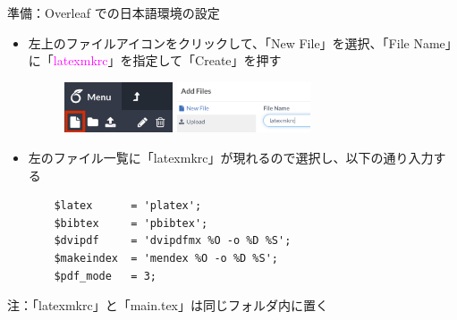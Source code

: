 \documentclass[dvipdfmx]{beamer}
\begin{document}
\begin{frame}[fragile]{準備：Overleaf での日本語環境の設定}
\begin{itemize}
    \item 左上のファイルアイコンをクリックして、「New File」を選択、「File Name」に「\textcolor{magenta}{latexmkrc}」を指定して「Create」を押す
    \begin{figure}
        \centering
        \includegraphics[height=1.5cm]{fig_new_file.jpg}
        \qquad
        \includegraphics[height=1.5cm]{fig_latexmkrc.pdf}
    \end{figure}
    
    \item 左のファイル一覧に「latexmkrc」が現れるので選択し、以下の通り入力する
    \begin{verbatim}
    $latex      = 'platex';
    $bibtex     = 'pbibtex';
    $dvipdf     = 'dvipdfmx %O -o %D %S';
    $makeindex  = 'mendex %O -o %D %S';
    $pdf_mode   = 3;
    \end{verbatim}
\end{itemize}
\alert{注}：「latexmkrc」と「main.tex」は同じフォルダ内に置く
\end{frame}
\end{document}
